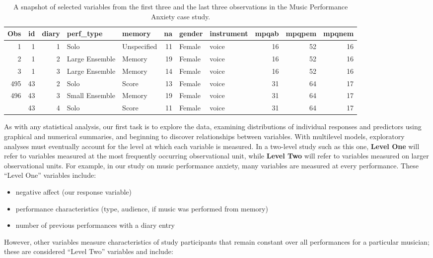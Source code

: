 \documentclass[
]{krantz}
\providecommand{\tightlist}{%
  \setlength{\itemsep}{0pt}\setlength{\parskip}{0pt}}
\begin{document}
\begin{table}[t]

\caption{\label{tab:table1chp8}A snapshot of selected variables from the first three and the last three observations in the Music Performance Anxiety case study.}
\centering
\begin{tabular}{rrrllrllrrr}
\toprule
Obs & id & diary & perf\_type & memory & na & gender & instrument & mpqab & mpqpem & mpqnem\\
\midrule
1 & 1 & 1 & Solo & Unspecified & 11 & Female & voice & 16 & 52 & 16\\
2 & 1 & 2 & Large Ensemble & Memory & 19 & Female & voice & 16 & 52 & 16\\
3 & 1 & 3 & Large Ensemble & Memory & 14 & Female & voice & 16 & 52 & 16\\
495 & 43 & 2 & Solo & Score & 13 & Female & voice & 31 & 64 & 17\\
496 & 43 & 3 & Small Ensemble & Memory & 19 & Female & voice & 31 & 64 & 17\\
\addlinespace
497 & 43 & 4 & Solo & Score & 11 & Female & voice & 31 & 64 & 17\\
\bottomrule
\end{tabular}
\end{table}

As with any statistical analysis, our first task is to explore the data, examining distributions of individual responses and predictors using graphical and numerical summaries, and beginning to discover relationships between variables. With multilevel models, exploratory analyses must eventually account for the level at which each variable is measured. In a two-level study such as this one, \textbf{Level One} will refer to variables measured at the most frequently occurring observational unit, while \textbf{Level Two} will refer to variables measured on larger observational units. For example, in our study on music performance anxiety, many variables are measured at every performance. These ``Level One'' variables include:

\begin{itemize}
\tightlist
\item
  negative affect (our response variable)
\item
  performance characteristics (type, audience, if music was performed from memory)
\item
  number of previous performances with a diary entry
\end{itemize}

However, other variables measure characteristics of study participants that remain constant over all performances for a particular musician; these are considered ``Level Two'' variables and include:
\end{document}
